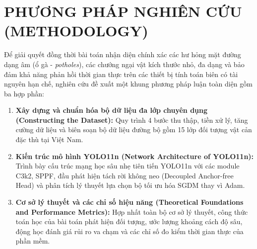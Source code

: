 % 

\section{PHƯƠNG PHÁP NGHIÊN CỨU (METHODOLOGY)}
\label{sec:methodology}

Để giải quyết đồng thời bài toán nhận diện chính xác các hư hỏng mặt đường dạng âm (ổ gà - \textit{potholes}), các chướng ngại vật kích thước nhỏ, đa dạng và bảo đảm khả năng phản hồi thời gian thực trên các thiết bị tính toán biên có tài nguyên hạn chế, nghiên cứu đề xuất một khung phương pháp luận toàn diện gồm ba hợp phần:
\begin{enumerate}
    \item \textbf{Xây dựng và chuẩn hóa bộ dữ liệu đa lớp chuyên dụng (Constructing the Dataset):} Quy trình 4 bước thu thập, tiền xử lý, tăng cường dữ liệu và biên soạn bộ dữ liệu đường bộ gồm 15 lớp đối tượng vật cản đặc thù tại Việt Nam.
    \item \textbf{Kiến trúc mô hình YOLO11n (Network Architecture of YOLO11n):} Trình bày cấu trúc mạng học sâu nhẹ tiên tiến YOLO11n với các module C3k2, SPPF, đầu phát hiện tách rời không neo (Decoupled Anchor-free Head) và phân tích lý thuyết lựa chọn bộ tối ưu hóa SGDM thay vì Adam.
    \item \textbf{Cơ sở lý thuyết và các chỉ số hiệu năng (Theoretical Foundations and Performance Metrics):} Hợp nhất toàn bộ cơ sở lý thuyết, công thức toán học của bài toán phát hiện đối tượng, ước lượng khoảng cách độ sâu, động học đánh giá rủi ro va chạm và các chỉ số đo kiểm thời gian thực của phần mềm.
\end{enumerate}

